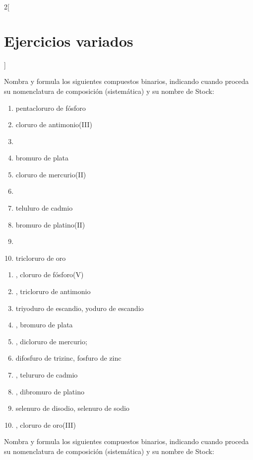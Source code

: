\documentclass[10pt]{article}
\begin{document}
\begin{multicols*}{2}[
  \section{Ejercicios variados}
  ]
\begin{exercise}[
    tags    = {inorgánica,compuestos binarios,sales binarias,sales},
    topics  = {química inorgánica,formulación,nomenclatura},
    source  = {SAN Formulación, p26, e29},
  ]
  Nombra y formula los siguientes compuestos binarios, indicando cuando proceda su nomenclatura de composición (sistemática) y su nombre de Stock:

  \begin{enumerate}
    \item pentacloruro de fósforo
    \item cloruro de antimonio(III)
    \item {}
    \item bromuro de plata
    \item cloruro de mercurio(II)
    \item {}
    \item teluluro de cadmio
    \item bromuro de platino(II)
    \item {}
    \item tricloruro de oro
  \end{enumerate}
\end{exercise}

\begin{solution}
  \begin{enumerate}
    \item {}, cloruro de fósforo(V)
    \item {}, tricloruro de antimonio
    \item triyoduro de escandio, yoduro de escandio
    \item {}, bromuro de plata
    \item {}, dicloruro de mercurio;
    \item difosfuro de trizinc, fosfuro de zinc
    \item {}, telururo de cadmio
    \item {}, dibromuro de platino
    \item selenuro de disodio, selenuro de sodio
    \item {}, cloruro de oro(III)
  \end{enumerate}
\end{solution}




\begin{exercise}[
    tags    = {inorgánica,compuestos binarios,sales binarias,sales},
    topics  = {química inorgánica,formulación,nomenclatura},
    source  = {SAN Formulación, p26, e30},
  ]
  Nombra y formula los siguientes compuestos binarios, indicando cuando proceda su nomenclatura de composición (sistemática) y su nombre de Stock:


\end{exercise}
\end{multicols*}
\end{document}
